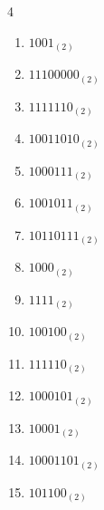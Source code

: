 \begin{multicols}{4}
\begin{enumerate}
        \phantom{$=105$}

  \item $1001_{(2)}$

        \phantom{$=9$}

\columnbreak %

  \item $11100000_{(2)}$

        \phantom{$=224$}

  \item $1111110_{(2)}$

        \phantom{$=126$}

  \item $10011010_{(2)}$

        \phantom{$=154$}

  \item $1000111_{(2)}$

        \phantom{$=71$}

  \item $1001011_{(2)}$

        \phantom{$=75$}

  \item $10110111_{(2)}$

        \phantom{$=183$}

  \item $1000_{(2)}$

        \phantom{$=8$}

  \item $1111_{(2)}$

        \phantom{$=15$}

  \item $100100_{(2)}$

        \phantom{$=36$}

  \item $111110_{(2)}$

        \phantom{$=62$}

  \item $1000101_{(2)}$

        \phantom{$=69$}

  \item $10001_{(2)}$

        \phantom{$=17$}

  \item $10001101_{(2)}$

        \phantom{$=141$}

  \item $101100_{(2)}$


\end{enumerate}
\end{multicols}

